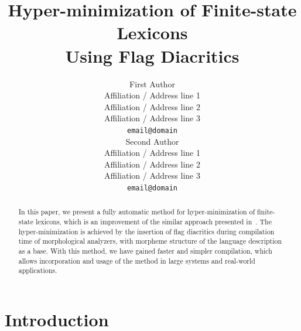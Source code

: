 \documentclass[11pt]{article}
\title{Hyper-minimization of Finite-state Lexicons \\Using Flag Diacritics}
\author{First Author \\
  Affiliation / Address line 1 \\
  Affiliation / Address line 2 \\
  Affiliation / Address line 3 \\
  {\tt email@domain} \\\And
  Second Author \\
  Affiliation / Address line 1 \\
  Affiliation / Address line 2 \\
  Affiliation / Address line 3 \\
  {\tt email@domain} \\}
\date{}
\begin{document}
\maketitle
\begin{abstract}
In this paper, we present a fully automatic method for hyper-minimization of finite-state lexicons, which is an improvement of the similar approach presented in~. The hyper-minimization is achieved by the insertion of flag diacritics during compilation time of morphological analyzers, with morpheme structure of the language description as a base. With this method, we have gained faster and simpler compilation, which allows incorporation and usage of the method in large systems and real-world applications.

\end{abstract}




\section{Introduction}
%
% 
\end{document}
